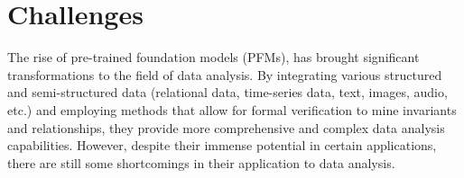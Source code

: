 \begin{table}
    \centering
    \caption{\textbf{Performance rankings of 10 out of 33 models on 9 linear and non-linear tasks.} The table shows the ranking performance of PFMs, supervised models, and unsupervised baselines across different task types. Lower ranks indicate better performance.}
    \label{tab:one-step-performance}
\end{table}



  \section{Challenges}
  
  The rise of pre-trained foundation models (PFMs), has brought significant transformations to the field of data analysis. By integrating various structured and semi-structured data (relational data, time-series data, text, images, audio, etc.) and employing methods that allow for formal verification to mine invariants and relationships, they provide more comprehensive and complex data analysis capabilities. However, despite their immense potential in certain applications, there are still some shortcomings in their application to data analysis.
  
